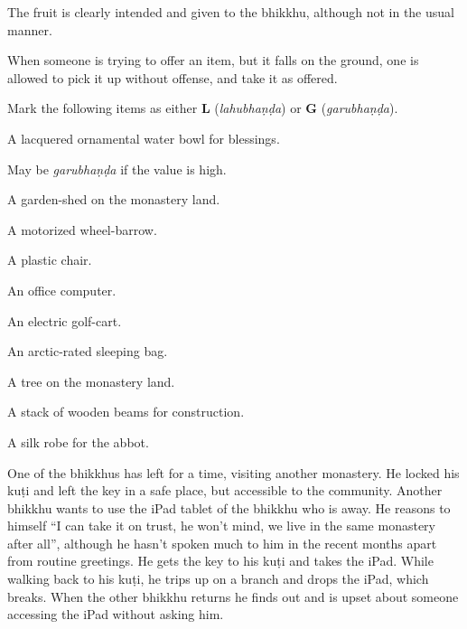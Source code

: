 \begin{exam}{\autoExamName}
\begin{problem}
  \begin{solution}
    The fruit is clearly intended and given to the bhikkhu, although not in the usual manner.

    When someone is trying to offer an item, but it falls on the ground, one is allowed to pick it up without offense, and take it as offered.
  \end{solution}

\end{problem}

\problemDivide

\begin{problem*}

  Mark the following items as either \textbf{L} (\emph{lahubhaṇḍa}) or \textbf{G} (\emph{garubhaṇḍa}).

  \bigskip

  \begin{parts}
    \item {} A lacquered ornamental water bowl for blessings.

    \begin{solution}
      May be \emph{garubhaṇḍa} if the value is high.
    \end{solution}

    \bigskip

    \item {} A garden-shed on the monastery land.
    \bigskip
    \item {} A motorized wheel-barrow.
    \bigskip
    \item {} A plastic chair.
    \bigskip
    \item {} An office computer.
    \bigskip
    \item {} An electric golf-cart.
    \bigskip
    \item {} An arctic-rated sleeping bag.
    \bigskip
    \item {} A tree on the monastery land.
    \bigskip
    \item {} A stack of wooden beams for construction.
    \bigskip
    \item {} A silk robe for the abbot.
  \end{parts}

\end{problem*}

\problemDivide

\begin{problem}

  One of the bhikkhus has left for a time, visiting another monastery.
  He locked his kuṭi and left the key in a safe place, but accessible to the community.
  Another bhikkhu wants to use the iPad tablet of the bhikkhu who is away.
  He reasons to himself ``I can take it on trust, he won't mind, we live in the same monastery after all'',
  although he hasn't spoken much to him in the recent months apart from routine greetings.
  He gets the key to his kuṭi and takes the iPad.
  While walking back to his kuṭi, he trips up on a branch and drops the iPad, which breaks.
  When the other bhikkhu returns he finds out and is upset about someone accessing the iPad without asking him.


\end{problem}
\end{exam}
